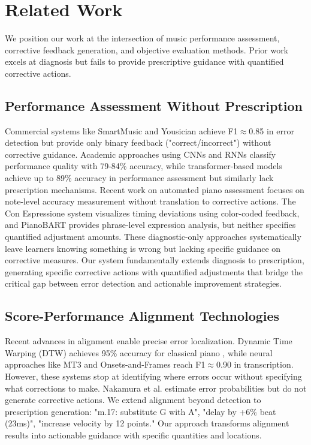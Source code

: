 \section{Related Work}
We position our work at the intersection of music performance assessment, corrective feedback generation, and objective evaluation methods. Prior work excels at diagnosis but fails to provide prescriptive guidance with quantified corrective actions.

\subsection{Performance Assessment Without Prescription}
Commercial systems like SmartMusic \cite{smartmusic} and Yousician \cite{yousician} achieve F1$\approx$0.85 in error detection but provide only binary feedback ("correct/incorrect") without corrective guidance.
Academic approaches using CNNs \cite{nakano2006} and RNNs \cite{seshadri2021} classify performance quality with 79-84\% accuracy, while transformer-based models \cite{wang2022} achieve up to 89\% accuracy in performance assessment but similarly lack prescription mechanisms.
Recent work on automated piano assessment \cite{sigtia2016} focuses on note-level accuracy measurement without translation to corrective actions.
The Con Espressione system \cite{wu2018} visualizes timing deviations using color-coded feedback, and PianoBART \cite{chou2022} provides phrase-level expression analysis, but neither specifies quantified adjustment amounts.
These diagnostic-only approaches systematically leave learners knowing something is wrong but lacking specific guidance on corrective measures.
Our system fundamentally extends diagnosis to prescription, generating specific corrective actions with quantified adjustments that bridge the critical gap between error detection and actionable improvement strategies.


\subsection{Score-Performance Alignment Technologies}
Recent advances in alignment enable precise error localization. Dynamic Time Warping (DTW) achieves 95\% accuracy for classical piano \cite{romani2015}, while neural approaches like MT3 \cite{mt3} and Onsets-and-Frames \cite{hawthorne2021} reach F1$\approx$0.90 in transcription.
However, these systems stop at identifying where errors occur without specifying what corrections to make.
Nakamura et al. \cite{nakamura2017} estimate error probabilities but do not generate corrective actions.
We extend alignment beyond detection to prescription generation: "m.17: substitute G with A", "delay by +6\% beat (23ms)", "increase velocity by 12 points."
Our approach transforms alignment results into actionable guidance with specific quantities and locations.

